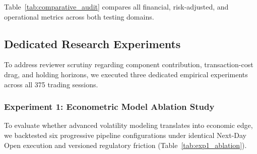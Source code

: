 \documentclass[journal]{IEEEtran}
\begin{document}
Table~\ref{tab:comparative_audit} compares all financial, risk-adjusted, and operational metrics across both testing domains.

\subsection{Dedicated Research Experiments}

To address reviewer scrutiny regarding component contribution, transaction-cost drag, and holding horizons, we executed three dedicated empirical experiments across all 375 trading sessions.

\subsubsection{Experiment 1: Econometric Model Ablation Study}
To evaluate whether advanced volatility modeling translates into economic edge, we backtested six progressive pipeline configurations under identical Next-Day Open execution and versioned regulatory friction (Table~\ref{tab:exp1_ablation}).

\begin{table}[!t]
\renewcommand{\arraystretch}{1.15}
\caption{Experiment 1: Model Ablation Study (375 Trading Sessions)}
\label{tab:exp1_ablation}
\centering
{}
\end{table}
\end{document}
